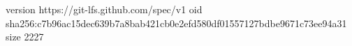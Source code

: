 version https://git-lfs.github.com/spec/v1
oid sha256:c7b96ac15dec639b7a8bab421cb0e2efd580df01557127bdbe9671c73ee94a31
size 2227
